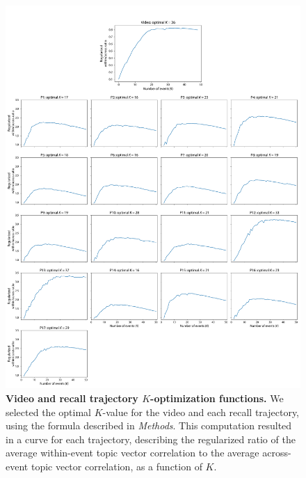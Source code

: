 \documentclass{article}
\begin{document}
\begin{figure}[p!]
\centering
\includegraphics[width=\textwidth]{figs/k_optimization}
\caption{\small \textbf{Video and recall trajectory $K$-optimization functions.}  We selected the optimal $K$-value for the video and each recall trajectory, using the formula described in \textit{Methods}. This computation resulted in a curve for each trajectory, describing the regularized ratio of the average within-event topic vector correlation to the average across-event topic vector correlation, as a function of $K$.}
\label{fig:k_optimization}
\end{figure}
\end{document}
